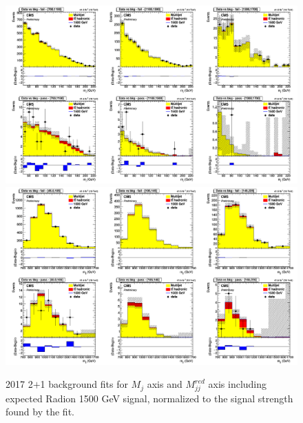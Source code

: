 \begin{figure}[!htb]
	\centering
	\includegraphics[width=1\textwidth]{Figures/postfit_projx_fits_1721.png}
	\includegraphics[width=1\textwidth]{Figures/postfit_projy_fits_1721.png}
	\caption{2017 2$+$1 background fits for $M_j$ axis and $M_{jj}^{red}$ axis including expected Radion 1500 GeV signal, normalized to the signal strength found by the fit.}
	\label{fig:1721}
\end{figure}
